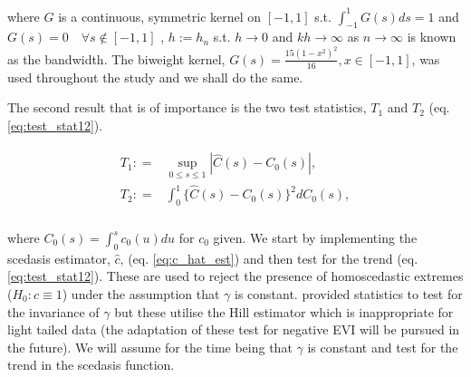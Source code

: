 \noindent where $G$ is a continuous, symmetric kernel on $[-1,1]$ s.t. $\int_{-1}^{1} G(s)ds = 1$ and $G(s) = 0 \quad \forall s \notin [-1,1]$ , $h := h_n$ s.t. $h \rightarrow 0$ and $kh \rightarrow \infty$ as $n \rightarrow \infty$ is known as the bandwidth. The biweight kernel, $G(s) = \frac{15(1-x^2)^2}{16}, x \in [-1,1]$, was used throughout the study and we shall do the same.%

The second result that is of importance is the two test statistics, $T_1$ and $T_2$ (eq. \ref{eq:test_stat12}).  

\begin{align} \label{eq:test_stat12}
\begin{split}
T_1 : =& \sup_{0 \le s \le 1} |\hat{C}(s) - C_0(s)|,\\
T_2 : =& \int_0^1 \{\hat{C}(s) - C_0(s)\}^2 dC_0(s),\\
\end{split}
\end{align}

\noindent where $C_0(s) = \int_0^s c_0(u)du$ for $c_0$ given. We start by implementing the scedasis estimator, $\hat{c}$, (eq. \ref{eq:c_hat_est}) and then test for the trend (eq. \ref{eq:test_stat12}). These are used to reject the presence of homoscedastic extremes ($H_0: c \equiv 1$) under the assumption that $\gamma$ is constant. \cite{einmahl16} provided statistics to test for the invariance of $\gamma$ but these utilise the Hill estimator which is inappropriate for light tailed data (the adaptation of these test for negative EVI will be pursued in the future). We will assume for the time being that $\gamma$ is constant and test for the trend in the scedasis function.


%

